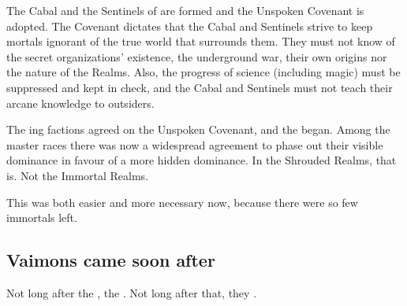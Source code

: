 The Cabal and the Sentinels of \Miith{} are formed and the Unspoken Covenant is adopted. The Covenant dictates that the Cabal and Sentinels strive to keep mortals ignorant of the true world that surrounds them. They must not know of the secret organizations' existence, the underground war, their own origins nor the nature of the Realms. Also, the progress of science (including magic) must be suppressed and kept in check, and the Cabal and Sentinels must not teach their arcane knowledge to outsiders. 

The \Feud ing factions agreed on the Unspoken Covenant, and the \charade{} began. 
Among the master races there was now a widespread agreement to phase out their visible dominance in favour of a more hidden dominance. 
In the Shrouded Realms, that is. 
Not the Immortal Realms. 

This was both easier and more necessary now, because there were so few immortals left. 










\subsection{Vaimons came soon after}
Not long after the \CuezcanApocalypse, the . 
Not long after that, they . 























